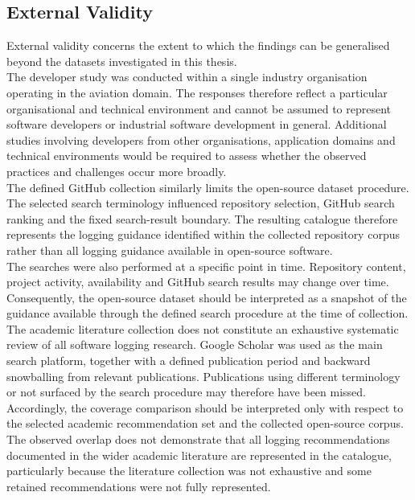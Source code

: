\subsection{External Validity}

External validity concerns the extent to which the findings can be generalised beyond
the datasets investigated in this thesis.
\\
The developer study was conducted within a single industry organisation operating in
the aviation domain. The responses therefore reflect a particular organisational and
technical environment and cannot be assumed to represent software developers or
industrial software development in general. Additional studies involving developers
from other organisations, application domains and technical environments would be
required to assess whether the observed practices and challenges occur more broadly.
\\
The defined GitHub collection similarly limits the open-source dataset procedure.
The selected search terminology influenced repository selection,
GitHub search ranking and the fixed search-result boundary. The resulting catalogue
therefore represents the logging guidance identified within the collected repository
corpus rather than all logging guidance available in open-source software.
\\
The searches were also performed at a specific point in time. Repository content,
project activity, availability and GitHub search results may change over time.
Consequently, the open-source dataset should be interpreted as a snapshot of the
guidance available through the defined search procedure at the time of collection.
\\
The academic literature collection does not constitute an exhaustive systematic
review of all software logging research. Google Scholar was used as the main search
platform, together with a defined publication period and backward snowballing from
relevant publications. Publications using different terminology or not surfaced by
the search procedure may therefore have been missed.
\\
Accordingly, the coverage comparison should be interpreted only with respect to
the selected academic recommendation set and the collected open-source corpus.
The observed overlap does not demonstrate that all logging recommendations
documented in the wider academic literature are represented in the catalogue,
particularly because the literature collection was not exhaustive and some
retained recommendations were not fully represented.

